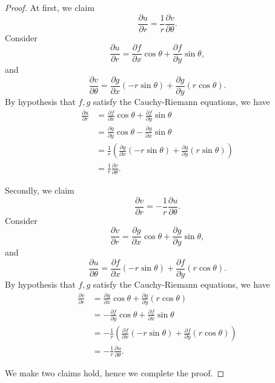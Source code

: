 \begin{Exercise}
\begin{proof}
At first, we claim
$$
\frac{\partial u}{\partial r} = \frac{1}{r}\frac{\partial v}{\partial \theta}.
$$
Consider
$$
\frac{\partial u}{\partial r} = \frac{\partial f}{\partial x}\cos \theta + \frac{\partial f}{\partial y}\sin \theta,
$$
and
$$
\frac{\partial v}{\partial \theta} = \frac{\partial g}{\partial x}(-r\sin\theta) + \frac{\partial g}{\partial y}(r\cos \theta).
$$
By hypothesis that $f,g$ satisfy the Cauchy-Riemann equations, we have
\begin{align*}
\frac{\partial u}{\partial r}
&= \frac{\partial f}{\partial x}\cos \theta + \frac{\partial f}{\partial y}\sin \theta \\
&= \frac{\partial g}{\partial y}\cos \theta - \frac{\partial g}{\partial x}\sin \theta \\
&= \frac{1}{r}\left( \frac{\partial g}{\partial x}(-r\sin \theta) + \frac{\partial g}{\partial y}(r\sin \theta) \right) \\
&= \frac{1}{r}\frac{\partial v}{\partial \theta}.
\end{align*}

Secondly, we claim
$$
\frac{\partial v}{\partial r} = -\frac{1}{r}\frac{\partial u}{\partial \theta}.
$$
Consider
$$
\frac{\partial v}{\partial r} = \frac{\partial g}{\partial x}\cos \theta + \frac{\partial g}{\partial y}\sin \theta,
$$
and
$$
\frac{\partial u}{\partial \theta} = \frac{\partial f}{\partial x}(-r\sin\theta) + \frac{\partial f}{\partial y}(r\cos\theta).
$$
By hypothesis that $f,g$ satisfy the Cauchy-Riemann equations, we have
\begin{align*}
\frac{\partial v}{\partial r}
&= \frac{\partial g}{\partial x}\cos\theta + \frac{\partial g}{\partial y}(r\cos\theta) \\
&= -\frac{\partial f}{\partial y}\cos\theta + \frac{\partial f}{\partial x}\sin\theta \\
&= -\frac{1}{r}\left( \frac{\partial f}{\partial x}(-r\sin\theta) + \frac{\partial f}{\partial y}(r\cos\theta) \right) \\
&= -\frac{1}{r}\frac{\partial u}{\partial \theta}.
\end{align*}

We make two claims hold, hence we complete the proof.
\end{proof}
\end{Exercise}